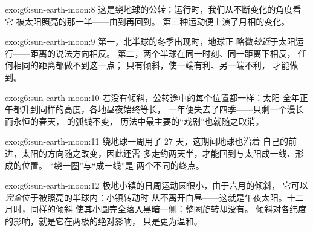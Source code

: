 \begin{solution}{exo:g6:sun-earth-moon:8}
这是绕地球的公转：运行时，我们从不断变化的角度看它
被太阳照亮的那一半——由到再回到。
第三种运动便上演了月相的变化。
\end{solution}

\begin{solution}{exo:g6:sun-earth-moon:9}
第一，北半球的冬季出现时，地球正
略微\emph{较近}于太阳运行——距离的说法方向相反。
第二，两个半球在同一时刻、同一距离下相反，
任何相同的距离都做不到这一点；
只有倾斜，使一端有利、另一端不利，
才能做到。
\end{solution}

\begin{solution}{exo:g6:sun-earth-moon:10}
若没有倾斜，公转途中的每个位置都一样：太阳
全年正午都升到同样的高度，各地昼夜始终等长，
一年便失去了四季——只剩一个漫长而永恒的春天，
的弧线不变，
历法中最主要的“戏剧”也就随之取消。
\end{solution}

\begin{solution}{exo:g6:sun-earth-moon:11}
绕地球一周用了 $27$ 天，这期间地球也沿着
自己的前进，太阳的方向随之改变，因此还需
多走约两天半，才能回到与太阳成一线、形成的位置。
“绕一圈”与“成一线”是
两个不同的终点。
\end{solution}

\begin{solution}{exo:g6:sun-earth-moon:12}
极地小镇的日周运动圆很小，由于六月的倾斜，
它可以\emph{完全}位于被照亮的半球内：小镇转动时
从不离开白昼——这就是午夜太阳。十二月时，同样的倾斜
使其小圆完全落入黑暗一侧：整圈旋转却没有。
倾斜对各纬度的影响，就是它在两极的绝对影响，
只是更为温和。
\end{solution}

